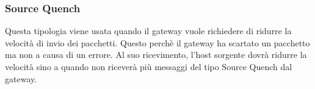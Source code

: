 \subsubsection{Source Quench} 
Questa tipologia viene usata quando il gateway vuole richiedere di ridurre la velocità di invio dei pacchetti. 
Questo perchè il gateway ha scartato un pacchetto ma non a causa di un errore.  
Al suo ricevimento, l'host sorgente dovrà ridurre la velocità sino a quando non 
riceverà più messaggi del tipo Source Quench dal gateway. 
\vspace{3ex} \newline
